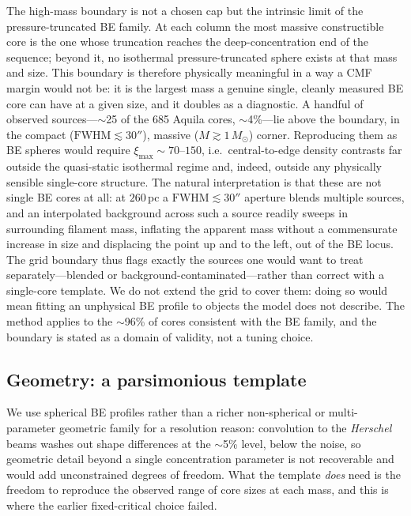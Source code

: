 \documentclass[11pt,a4paper]{article}
\newcommand{\msun}{M_{\odot}}
\newcommand{\ximax}{\xi_{\mathrm{max}}}
\begin{document}
The high-mass boundary is not a chosen cap but the intrinsic limit of the
pressure-truncated BE family. At each column the most massive constructible
core is the one whose truncation reaches the deep-concentration end of the
sequence; beyond it, no isothermal pressure-truncated sphere exists at that
mass and size. This boundary is therefore physically meaningful in a way a CMF
margin would not be: it is the largest mass a genuine single, cleanly measured
BE core can have at a given size, and it doubles as a diagnostic. A handful of
observed sources---$\sim$25 of the 685 Aquila cores, $\sim$4\%---lie above the
boundary, in the compact ($\mathrm{FWHM}\lesssim30''$), massive
($M\gtrsim1\,\msun$) corner. Reproducing them as BE spheres would require
$\ximax\sim70$--$150$, i.e.\ central-to-edge density contrasts far outside the
quasi-static isothermal regime and, indeed, outside any physically sensible
single-core structure. The natural interpretation is that these are not single
BE cores at all: at $260\,$pc a $\mathrm{FWHM}\lesssim30''$ aperture blends
multiple sources, and an interpolated background across such a source readily
sweeps in surrounding filament mass, inflating the apparent mass without a
commensurate increase in size and displacing the point up and to the left, out
of the BE locus. The grid boundary thus flags exactly the sources one would
want to treat separately---blended or background-contaminated---rather than
correct with a single-core template. We do not extend the grid to cover them:
doing so would mean fitting an unphysical BE profile to objects the model does
not describe. The method applies to the $\sim$96\% of cores consistent with
the BE family, and the boundary is stated as a domain of validity, not a
tuning choice.

\subsection{Geometry: a parsimonious template}
\label{sec:geometry}

We use spherical BE profiles rather than a richer non-spherical or
multi-parameter geometric family for a resolution reason: convolution to the
\emph{Herschel} beams washes out shape differences at the $\sim$5\% level, below
the noise, so geometric detail beyond a single concentration parameter is not
recoverable and would add unconstrained degrees of freedom. What the template
\emph{does} need is the freedom to reproduce the observed range of core sizes at
each mass, and this is where the earlier fixed-critical choice failed.
\end{document}
